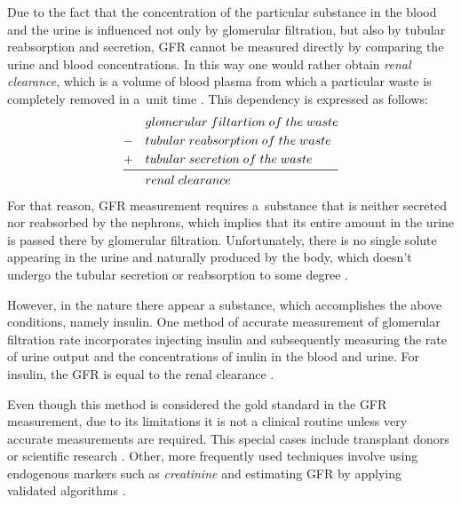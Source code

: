Due to the fact that the concentration of the particular substance in the blood and the urine is influenced not only by glomerular filtration, but also by tubular reabsorption and secretion, GFR cannot be measured directly by comparing the urine and blood concentrations. In this way one would rather obtain \textit{renal clearance}, which is a volume of blood plasma from which a particular waste is completely removed in a~unit time \cite{saladin}. This dependency is expressed as follows:
\begin{equation}
\begin{aligned}
&glomerular\;filtartion\;of\;the\;waste\\
-\quad&tubular\;reabsorption\;of\;the\;waste\\
+\quad&tubular\;secretion\;of\;the\;waste\\
\midrule
&renal\;clearance
\end{aligned}	
\label{eq:gfr_formula}
\end{equation}
For that reason, GFR measurement requires a~substance that is neither secreted nor reabsorbed by the nephrons, which implies that its entire amount in the urine is passed there by glomerular filtration. Unfortunately, there is no single solute appearing in the urine and naturally produced by the body, which doesn't undergo the tubular secretion or reabsorption to some degree \cite{delanaye2012measuring}. 

However, in the nature there appear a substance, which accomplishes the above conditions, namely insulin. One method of accurate measurement of glomerular filtration rate incorporates injecting insulin and subsequently measuring the rate of urine output and the concentrations of inulin in the blood and urine. For insulin, the GFR is equal to the renal clearance \cite{saladin, delanaye2012measuring}.


Even though this method is considered the gold standard in the GFR measurement, due to its limitations it is not a clinical routine unless very accurate measurements are required. This special cases include transplant donors or scientific research \cite{traynor2006measure}. 
Other, more frequently used techniques involve using endogenous markers such as \textit{creatinine} and estimating GFR by applying validated algorithms \cite{delanaye2012measuring}. 
 